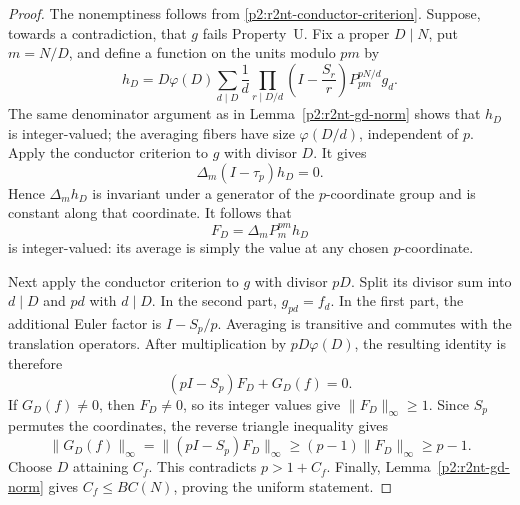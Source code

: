 \documentclass[11pt,a4paper]{article}
\theoremstyle{definition}
\theoremstyle{remark}
\numberwithin{equation}{section}
\begin{document}
\begin{proof}
The nonemptiness follows from
\eqref{p2:r2nt-conductor-criterion}.  Suppose, towards a contradiction,
that $g$ fails Property~U.  Fix a proper $D\mid N$, put $m=N/D$,
and define a function on the units modulo $pm$ by
\[
 h_D=D\varphi(D)\sum_{d\mid D}\frac1d
       \prod_{r\mid D/d}\left(I-\frac{S_r}{r}\right)
       P_{pm}^{pN/d}g_d.
\]
The same denominator argument as in
Lemma~\ref{p2:r2nt-gd-norm} shows that $h_D$ is integer-valued;
the averaging fibers have size $\varphi(D/d)$, independent of $p$.
Apply the conductor criterion to $g$ with divisor $D$.  It gives
\[
 \Delta_m(I-\tau_p)h_D=0.
\]
Hence $\Delta_m h_D$ is invariant under a generator of the
$p$-coordinate group and is constant along that coordinate.
It follows that
\[
 F_D=\Delta_m P_m^{pm}h_D
\]
is integer-valued: its average is simply the value at any chosen
$p$-coordinate.

Next apply the conductor criterion to $g$ with divisor $pD$.
Split its divisor sum into $d\mid D$ and $pd$ with $d\mid D$.
In the second part, $g_{pd}=f_d$.  In the first part, the additional
Euler factor is $I-S_p/p$.  Averaging is transitive and commutes
with the translation operators.  After multiplication by
$pD\varphi(D)$, the resulting identity is therefore
\begin{equation}
\label{p2:r2nt-integral-descent-equation}
 (pI-S_p)F_D+G_D(f)=0.
\end{equation}
If $G_D(f)\ne0$, then $F_D\ne0$, so its integer values give
$\|F_D\|_\infty\ge1$.  Since $S_p$ permutes the coordinates,
the reverse triangle inequality gives
\[
 \|G_D(f)\|_\infty
 =\|(pI-S_p)F_D\|_\infty
 \ge(p-1)\|F_D\|_\infty
 \ge p-1.
\]
Choose $D$ attaining $C_f$.  This contradicts $p>1+C_f$.
Finally, Lemma~\ref{p2:r2nt-gd-norm} gives $C_f\le B C(N)$,
proving the uniform statement.
\end{proof}
\end{document}
